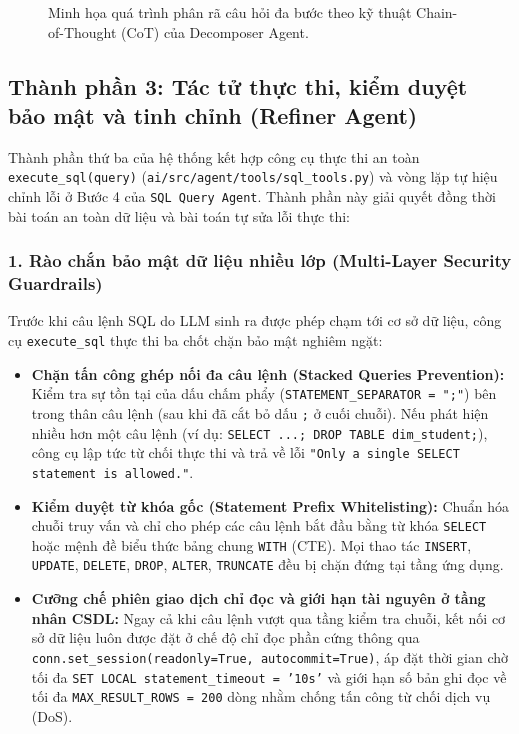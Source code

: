 \documentclass[12pt,a4paper]{report}
\begin{document}
\begin{figure}[H]
\caption{Minh họa quá trình phân rã câu hỏi đa bước theo kỹ thuật Chain-of-Thought (CoT) của Decomposer Agent.}
\label{fig:cot_decomposition_example}
\end{figure}

\subsection{Thành phần 3: Tác tử thực thi, kiểm duyệt bảo mật và tinh chỉnh (Refiner Agent)}

Thành phần thứ ba của hệ thống kết hợp công cụ thực thi an toàn \texttt{execute\_sql(query)} (\texttt{ai/src/agent/tools/sql\_tools.py}) và vòng lặp tự hiệu chỉnh lỗi ở Bước 4 của \texttt{SQL Query Agent}. Thành phần này giải quyết đồng thời bài toán an toàn dữ liệu và bài toán tự sửa lỗi thực thi:

\subsubsection{1. Rào chắn bảo mật dữ liệu nhiều lớp (Multi-Layer Security Guardrails)}
Trước khi câu lệnh SQL do LLM sinh ra được phép chạm tới cơ sở dữ liệu, công cụ \texttt{execute\_sql} thực thi ba chốt chặn bảo mật nghiêm ngặt:
\begin{itemize}
    \item \textbf{Chặn tấn công ghép nối đa câu lệnh (Stacked Queries Prevention):} Kiểm tra sự tồn tại của dấu chấm phẩy (\texttt{STATEMENT\_SEPARATOR = ";"}) bên trong thân câu lệnh (sau khi đã cắt bỏ dấu \texttt{;} ở cuối chuỗi). Nếu phát hiện nhiều hơn một câu lệnh (ví dụ: \texttt{SELECT ...; DROP TABLE dim\_student;}), công cụ lập tức từ chối thực thi và trả về lỗi \texttt{"Only a single SELECT statement is allowed."}.
    \item \textbf{Kiểm duyệt từ khóa gốc (Statement Prefix Whitelisting):} Chuẩn hóa chuỗi truy vấn và chỉ cho phép các câu lệnh bắt đầu bằng từ khóa \texttt{SELECT} hoặc mệnh đề biểu thức bảng chung \texttt{WITH} (CTE). Mọi thao tác \texttt{INSERT}, \texttt{UPDATE}, \texttt{DELETE}, \texttt{DROP}, \texttt{ALTER}, \texttt{TRUNCATE} đều bị chặn đứng tại tầng ứng dụng.
    \item \textbf{Cưỡng chế phiên giao dịch chỉ đọc và giới hạn tài nguyên ở tầng nhân CSDL:} Ngay cả khi câu lệnh vượt qua tầng kiểm tra chuỗi, kết nối cơ sở dữ liệu luôn được đặt ở chế độ chỉ đọc phần cứng thông qua \texttt{conn.set\_session(readonly=True, autocommit=True)}, áp đặt thời gian chờ tối đa \texttt{SET LOCAL statement\_timeout = '10s'} và giới hạn số bản ghi đọc về tối đa \texttt{MAX\_RESULT\_ROWS = 200} dòng nhằm chống tấn công từ chối dịch vụ (DoS).
\end{itemize}
\end{document}
